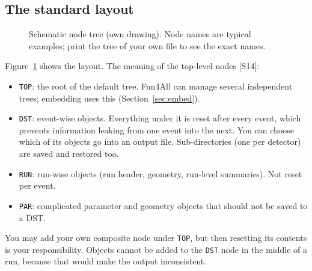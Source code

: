 \documentclass[11pt,letterpaper]{article}
\begin{document}
\subsection{The standard layout}
\begin{figure}[h]\centering
{}
\caption{Schematic node tree (own drawing). Node names are typical examples; print the tree of your own file to see the exact names.}\label{fig:tree}
\end{figure}
Figure~\ref{fig:tree} shows the layout. The meaning of the top-level nodes [S14]:
\begin{itemize}
\item \texttt{TOP}: the root of the default tree. Fun4All can manage several independent trees; embedding uses this (Section~\ref{sec:embed}).
\item \texttt{DST}: event-wise objects. Everything under it is reset after every event, which prevents information leaking from one event into the next.
You can choose which of its objects go into an output file. Sub-directories (one per detector) are saved and restored too.
\item \texttt{RUN}: run-wise objects (run header, geometry, run-level summaries). Not reset per event.
\item \texttt{PAR}: complicated parameter and geometry objects that should not be saved to a DST.
\end{itemize}
You may add your own composite node under \texttt{TOP}, but then resetting its contents is your responsibility.
Objects cannot be added to the \texttt{DST} node in the middle of a run, because that would make the output inconsistent.
\end{document}
